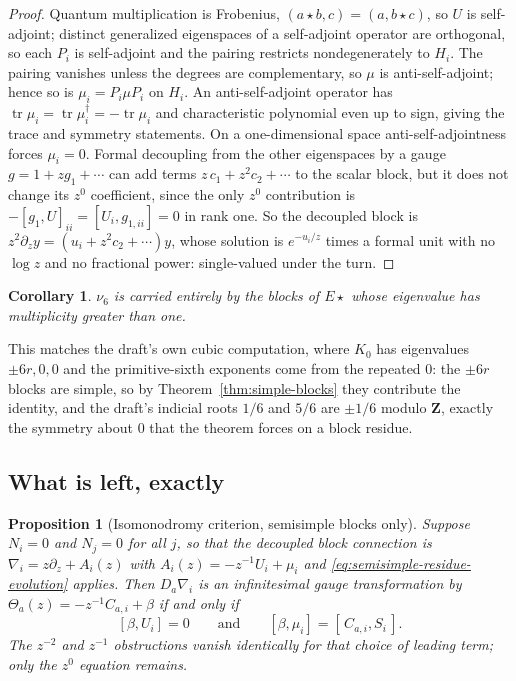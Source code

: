 \documentclass[11pt]{article}
\newtheorem{proposition}[theorem]{Proposition}
\newtheorem{corollary}[theorem]{Corollary}
\theoremstyle{definition}
\theoremstyle{remark}
\newcommand{\Z}{\mathbf Z}
\begin{document}
\begin{proof}
Quantum multiplication is Frobenius, $(a\star b,c)=(a,b\star c)$, so $U$ is
self-adjoint; distinct generalized eigenspaces of a self-adjoint operator are
orthogonal, so each $P_i$ is self-adjoint and the pairing restricts
nondegenerately to $H_i$. The pairing vanishes unless the degrees are
complementary, so $\mu$ is anti-self-adjoint; hence so is
$\mu_i=P_i\mu P_i$ on $H_i$. An anti-self-adjoint operator has
$\operatorname{tr}\mu_i=\operatorname{tr}\mu_i^{\dagger}=-\operatorname{tr}\mu_i$
and characteristic polynomial even up to sign, giving the trace and symmetry
statements. On a one-dimensional space anti-self-adjointness forces $\mu_i=0$.
Formal decoupling from the other eigenspaces by a gauge $g=1+zg_1+\cdots$ can
add terms $z\,c_1+z^2c_2+\cdots$ to the scalar block, but it does not change its
$z^0$ coefficient, since the only $z^0$ contribution is
$-[g_1,U]_{ii}=[U_i,g_{1,ii}]=0$ in rank one. So the decoupled block is
$z^2\partial_zy=(u_i+z^2c_2+\cdots)y$, whose solution is $e^{-u_i/z}$ times a
formal unit with no $\log z$ and no fractional power: single-valued under the
turn.
\end{proof}

\begin{corollary}
\label{cor:coalesced-only}
$\nu_6$ is carried entirely by the blocks of $E\star$ whose eigenvalue has
multiplicity greater than one.
\end{corollary}

This matches the draft's own cubic computation, where $K_0$ has eigenvalues
$\pm6r,0,0$ and the primitive-sixth exponents come from the repeated $0$: the
$\pm6r$ blocks are simple, so by Theorem~\ref{thm:simple-blocks} they contribute
the identity, and the draft's indicial roots $1/6$ and $5/6$ are $\pm1/6$ modulo
$\Z$, exactly the symmetry about $0$ that the theorem forces on a block residue.

\subsection*{What is left, exactly}

\begin{proposition}[Isomonodromy criterion, semisimple blocks only]
\label{prop:block-isomonodromy}
Suppose $N_i=0$ and $N_j=0$ for all $j$, so that the decoupled block connection
is $\nabla_i=z\partial_z+A_i(z)$ with $A_i(z)=-z^{-1}U_i+\mu_i$ and
\eqref{eq:semisimple-residue-evolution} applies. Then $D_a\nabla_i$ is an
infinitesimal gauge transformation by $\Theta_a(z)=-z^{-1}C_{a,i}+\beta$ if and
only if
\[
  [\beta,U_i]=0
  \qquad\text{and}\qquad
  [\beta,\mu_i]=[\,C_{a,i},S_i\,].
\]
The $z^{-2}$ and $z^{-1}$ obstructions vanish identically for that choice of
leading term; only the $z^0$ equation remains.
\end{proposition}
\end{document}
